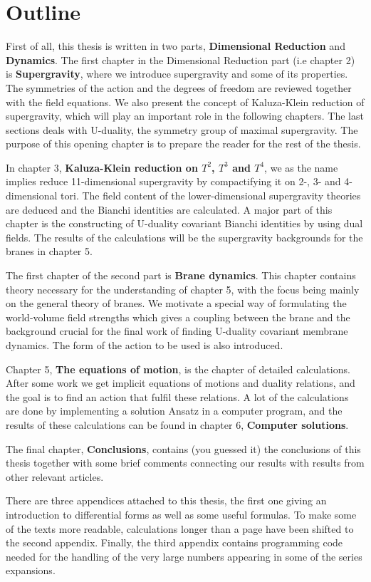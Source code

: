 \section{Outline}
First of all, this thesis is written in two parts, \textbf{Dimensional Reduction} and \textbf{Dynamics}. The first chapter 
in the Dimensional Reduction part (i.e chapter 2) is \textbf{Supergravity}, where we introduce supergravity and some of its properties. The symmetries of the action and 
the degrees of freedom are reviewed together with the field equations. We also present the concept of Kaluza-Klein reduction of supergravity, 
which will play an important role in the following chapters. The last sections deals with U-duality, the symmetry group 
of maximal supergravity. The purpose of this opening chapter is to prepare the reader for the rest of the thesis.

In chapter 3, \textbf{Kaluza-Klein reduction on $T^2$, $T^3$ and $T^4$}, we as the name implies reduce 11-dimensional 
supergravity by compactifying it on 2-, 3- and 4-dimensional tori. The field content 
of the lower-dimensional supergravity theories are deduced and the Bianchi identities are calculated. A major part 
of this chapter is the constructing of U-duality covariant Bianchi identities by using dual fields. The results of the 
calculations will be the supergravity backgrounds for the branes in chapter 5. 

The first chapter of the second part is \textbf{Brane dynamics}. This chapter contains theory necessary for the understanding 
of chapter 5, with the focus being mainly on the general theory of branes. We motivate a special way of formulating the world-volume 
field strengths which gives a coupling between the brane and the background crucial for the final work of finding U-duality 
covariant membrane dynamics. The form of the action to be used is also introduced.

Chapter 5, \textbf{The equations of motion}, is the chapter of detailed calculations. After some work we get implicit equations of 
motions and duality relations, and the goal is to find an action that fulfil these relations. A lot of the calculations 
are done by implementing a solution Ansatz in a computer program, and the results of these calculations can be found in chapter 6, \textbf{Computer solutions}.

The final chapter, \textbf{Conclusions}, contains (you guessed it) the conclusions of this thesis together with some 
brief comments connecting our results with results from other relevant articles.

There are three appendices attached to this thesis, the first one giving an introduction to differential forms as well 
as some useful formulas. To make some of the texts more readable, calculations longer than a page have been shifted to the 
second appendix. Finally, the third appendix contains programming code needed for the handling of the very large numbers appearing in some 
of the series expansions.

